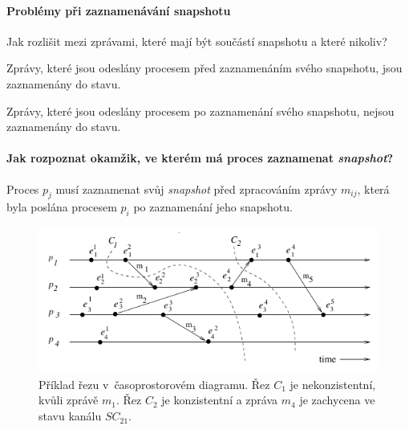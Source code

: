 \paragraph*{Problémy při zaznamenávání snapshotu} Jak rozlišit mezi zprávami, které mají být součástí snapshotu a které nikoliv?
\begin{compactitem}
    \item Zprávy, které jsou odeslány procesem před zaznamenáním svého  snapshotu, jsou zaznamenány do stavu.
    \item Zprávy, které jsou odeslány procesem po zaznamenání svého  snapshotu, nejsou zaznamenány do stavu.
\end{compactitem}

\paragraph*{Jak rozpoznat okamžik, ve kterém má proces zaznamenat \textit{snapshot}?}
\begin{compactitem}
    \item Proces $p_j$ musí zaznamenat svůj \textit{snapshot} před zpracováním zprávy $m_{ij}$, která byla poslána procesem $p_i$ po zaznamenání jeho snapshotu.
\end{compactitem}

\begin{figure}[H]
    \centering
    \includegraphics[width=1\linewidth]{example_cut.pdf}
    \caption{Příklad řezu v~časoprostorovém diagramu. Řez $C_1$ je nekonzistentní, kvůli zprávě $m_1$. Řez $C_2$ je konzistentní a zpráva $m_4$ je zachycena ve stavu kanálu $SC_{21}$.}
    \label{48_example_cut}
\end{figure}

